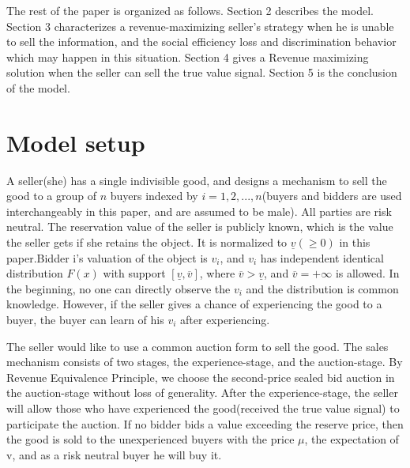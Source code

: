 \documentclass[review]{elsarticle}
\begin{document}
The rest of the paper is organized as follows. Section 2 describes
the model. Section 3 characterizes a revenue-maximizing seller's
strategy when he is unable to sell the information, and the social efficiency
loss and discrimination behavior which may happen in this
situation. Section 4 gives a Revenue maximizing solution when the seller can sell the true value signal. Section 5 is the conclusion of the model.

\section{Model setup}

A seller(she) has a single indivisible good, and
designs a mechanism to sell the good to a group of $n$ buyers indexed by $i=1,2,...,n$(buyers and
bidders are used interchangeably in this paper, and are assumed to be
male). All parties are risk neutral.
 The reservation value of the seller is publicly known, which is the value the seller gets
if she retains the object. It is normalized to $\underline{v}(\geq 0)$ in this paper.Bidder i's valuation of the object
is $v_{i}$, and $v_{i}$ has independent identical distribution $F(x)$ with support $[\underline{v},\overline{v}]$,
where $\overline{v}>\underline{v}$, and $\overline{v}=+\infty$ is allowed. 
In the beginning, no one can directly observe the $v_{i}$ and the distribution is common knowledge. However, if the seller gives a chance of experiencing the good to a buyer, the buyer can learn of his $v_{i}$ after experiencing.
 

The seller would like to use a common auction form to sell the
good.  The sales mechanism consists of two stages, the experience-stage, and the auction-stage. By  Revenue Equivalence Principle, we choose the second-price
sealed bid auction in the auction-stage without loss of generality.
After the  experience-stage, the seller will allow those who
have experienced the good(received the true value signal) to
participate the auction. If no bidder bids a value exceeding the
reserve price, then the good is sold to the unexperienced buyers with the
price $\mu$, the expectation of v, and as a risk neutral buyer he will buy it.
\end{document}
